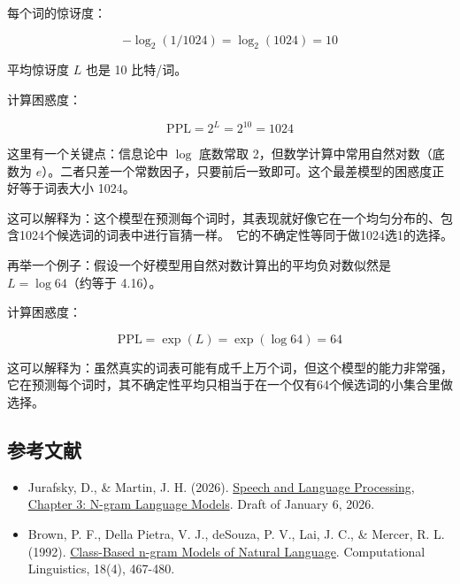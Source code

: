 每个词的惊讶度：

\[
-\log_2(1/1024)=\log_2(1024)=10
\]

平均惊讶度 \(L\) 也是 10 比特/词。

计算困惑度：

\[
\mathrm{PPL}=2^L=2^{10}=1024
\]

这里有一个关键点：信息论中 \(\log\) 底数常取 2，但数学计算中常用自然对数（底数为 \(e\)）。二者只差一个常数因子，只要前后一致即可。这个最差模型的困惑度正好等于词表大小 1024。

这可以解释为：这个模型在预测每个词时，其表现就好像它在一个均匀分布的、包含1024个候选词的词表中进行盲猜一样。~它的不确定性等同于做1024选1的选择。

再举一个例子：假设一个好模型用自然对数计算出的平均负对数似然是 \(L=\log 64\)（约等于 4.16）。

计算困惑度：

\[
\mathrm{PPL}=\exp(L)=\exp(\log 64)=64
\]

这可以解释为：虽然真实的词表可能有成千上万个词，但这个模型的能力非常强，它在预测每个词时，其不确定性平均只相当于在一个仅有64个候选词的小集合里做选择。

\hypertarget{ux53c2ux8003ux6587ux732e-106}{%
\subsection{参考文献}\label{ux53c2ux8003ux6587ux732e-106}}

\begin{itemize}
\tightlist
\item
  Jurafsky, D., \& Martin, J. H. (2026). \href{https://web.stanford.edu/~jurafsky/slp3/3.pdf}{Speech and Language Processing, Chapter 3: N-gram Language Models}. Draft of January 6, 2026.
\item
  Brown, P. F., Della Pietra, V. J., deSouza, P. V., Lai, J. C., \& Mercer, R. L. (1992). \href{https://aclanthology.org/J92-4003/}{Class-Based n-gram Models of Natural Language}. Computational Linguistics, 18(4), 467-480.
\end{itemize}

\clearpage
